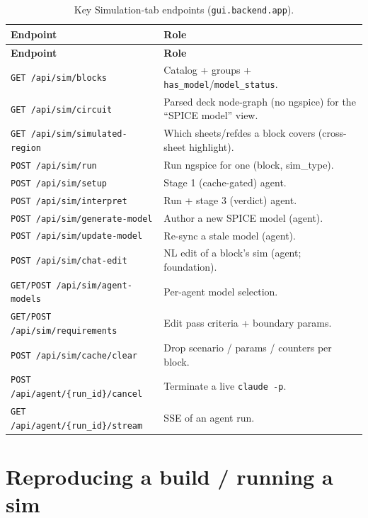 \documentclass[11pt]{article}
\newcommand{\mod}[1]{\texttt{#1}}
\begin{document}
\begin{longtable}{p{} p{}}
\caption{Key Simulation-tab endpoints (\mod{gui.backend.app}).}\label{tab:simapi}\\
\toprule
\textbf{Endpoint} & \textbf{Role}\\
\midrule
\endfirsthead
\toprule
\textbf{Endpoint} & \textbf{Role}\\
\midrule
\endhead
\texttt{GET /api/sim/blocks} & Catalog + groups + \texttt{has\_model}/\texttt{model\_status}.\\
\texttt{GET /api/sim/circuit} & Parsed deck node-graph (no ngspice) for the ``SPICE model'' view.\\
\texttt{GET /api/sim/simulated-region} & Which sheets/refdes a block covers (cross-sheet highlight).\\
\texttt{POST /api/sim/run} & Run ngspice for one (block, sim\_type).\\
\texttt{POST /api/sim/setup} & Stage 1 (cache-gated) agent.\\
\texttt{POST /api/sim/interpret} & Run + stage 3 (verdict) agent.\\
\texttt{POST /api/sim/generate-model} & Author a new SPICE model (agent).\\
\texttt{POST /api/sim/update-model} & Re-sync a stale model (agent).\\
\texttt{POST /api/sim/chat-edit} & NL edit of a block's sim (agent; foundation).\\
\texttt{GET/POST /api/sim/agent-models} & Per-agent model selection.\\
\texttt{GET/POST /api/sim/requirements} & Edit pass criteria + boundary params.\\
\texttt{POST /api/sim/cache/clear} & Drop scenario / params / counters per block.\\
\texttt{POST /api/agent/\{run\_id\}/cancel} & Terminate a live \texttt{claude -p}.\\
\texttt{GET /api/agent/\{run\_id\}/stream} & SSE of an agent run.\\
\bottomrule
\end{longtable}

\section{Reproducing a build / running a sim}
\end{document}
